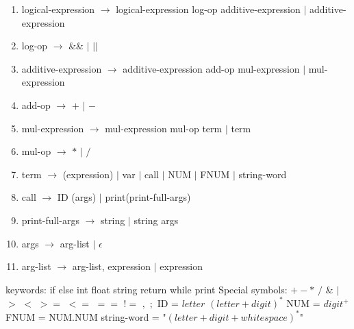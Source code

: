 \documentclass{article}
\begin{document}
\begin{enumerate}
    \item logical-expression $\rightarrow$ logical-expression log-op additive-expression $|$ additive-expression
    \item log-op $\rightarrow$ \&\& $|$ $||$
    \item additive-expression $\rightarrow$ additive-expression add-op mul-expression $|$ mul-expression
    \item add-op $\rightarrow$ $+$ $|$ $-$
    \item mul-expression $\rightarrow$ mul-expression mul-op term $|$ term
    \item mul-op $\rightarrow$ $*$ $|$ $/$
    \item term $\rightarrow$ (expression) $|$ var $|$ call $|$ NUM $|$ FNUM $|$ string-word
    \item call $\rightarrow$ ID (args) $|$ print(print-full-args)
    \item print-full-args $\rightarrow$ string $|$ string args
    \item args $\rightarrow$ arg-list $|$ $\epsilon$
    \item arg-list $\rightarrow$ arg-list, expression $|$ expression
\end{enumerate}

keywords: if else int float string return while print \newline
Special symbols: $+ - *$ $/$ \& $|$ $>$ $<$ $>=$ $<=$ $==$ $!=$ $,$ $;$\newline
ID = $letter$ $(letter + digit)^*$ \newline
NUM = $digit^+$ \newline
FNUM = NUM.NUM \newline
string-word = "$(letter + digit + whitespace)^*$"
\end{document}
